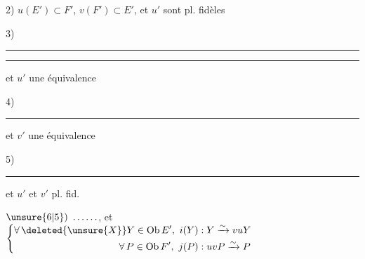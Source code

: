 2) $u(E')\subset F'$, $v(F')\subset E'$, et $u'$  sont pl. fidèles

3) \rule{1.1em}{.4pt}\quad\rule{2.1em}{.4pt}\quad et $u'$ une équivalence

4) \rule{3.8em}{.4pt}\quad et $v'$ une équivalence

5) \rule{3.8em}{.4pt}\quad et $u'$ et $v'$ pl. fid.

$\unsure{6|5})\ \ldots\ldots$, et $\left\{\begin{aligned}
\forall\,\deleted{\unsure{X}}Y\in\operatorname{Ob}E',\ i(Y)&:Y\xrightarrow{\sim}vuY\\
\forall\,P\in\operatorname{Ob}F',\ j(P)&:uvP\xrightarrow{\sim}P
\end{aligned}\right.$

